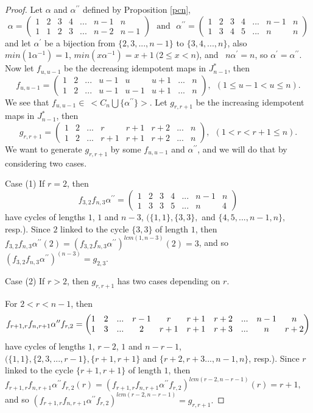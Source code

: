 \documentclass[10pt]{extarticle}
\numberwithin{equation}{section}
\numberwithin{bbb}{section}
\numberwithin{equation}{section}
\begin{document}
\begin{proof}
Let $\alpha$ and $\alpha^{\prime\prime}$ defined by Proposition \ref{pcn},
$$\alpha=
\begin{pmatrix}  
1&2&3&4&...&n-1&n\\1&1&2&3&...&n-2&n-1
\end{pmatrix} \ \ \ \text{and} \ \ \ 
\alpha^{\prime\prime}=
\begin{pmatrix}  
1&2&3&4&...&n-1&n\\1&3&4&5&...&n&n
\end{pmatrix}$$
and let $\alpha^{\prime}$ be a bijection from $\{2,3,...,n-1\}$ to $\{3,4,...,n\}$, also $min(1\alpha^{-1})=1$, $min(x\alpha^{-1})=x+1 \ (2\leq x <n$), and \ $n\alpha^{\prime}=n$, so
$\alpha^{\prime}=\alpha^{\prime\prime}.$
Now let $f_{u,u-1}$ be the decreasing idempotent maps in $J^*_{n-1}$, then
$$f_{u,u-1}=
\begin{pmatrix}  
1&2&...&u-1&u&u+1&...&n\\1&2&...&u-1&u-1&u+1&...&n
\end{pmatrix}, \ \ (1\leq u-1 <u \leq n).$$
We see that
$f_{u,u-1} \in \ <C_n \bigcup \{\alpha^{\prime\prime}\}>.$
Let $g_{r,r+1}$ be the increasing idempotent maps in $J^*_{n-1}$, then
$$g_{r,r+1}=
\begin{pmatrix}  
1&2&...&r&r+1&r+2&...&n\\1&2&...&r+1&r+1&r+2&...&n
\end{pmatrix}, \ \ (1<r<r+1 \leq n).$$
We want to generate $g_{r,r+1}$ by some $f_{u,u-1}$ and
$\alpha^{\prime\prime}$,
and we will do that by considering two cases.

\vspace{0.2cm}
Case (1) If $r=2$, then
$$f_{3,2} f_{n,3} \alpha^{\prime\prime}=
\begin{pmatrix}  
1&2&3&4&...&n-1&n\\1&3&3&5&...&n&4
\end{pmatrix}$$
have cycles of lengths $1$, $1$ and $n-3$, $( \{1,1\}, \{3,3\},$ and $\{4,5,...,n-1,n\},$ resp.). Since $2$ linked to the cycle $\{3,3\}$ of length $1$, then $f_{3,2} f_{n,3} \alpha^{\prime\prime}(2)=
(f_{3,2} f_{n,3} \alpha^{\prime\prime})^{lcm(1,n-3)}(2)=3$, and so $(f_{3,2} f_{n,3} \alpha^{\prime\prime})^{(n-3)}=g_{2,3}.$

\vspace{0.2cm}
Case (2) If $r>2$, then $g_{r,r+1}$ has two cases depending on $r$.

\vspace{0.2cm}
For $2<r<n-1$, then
$$f_{r+1,r}f_{n,r+1}\alpha^{\prime\prime}f_{r,2}=
\setcounter{MaxMatrixCols}{14}
\begin{pmatrix}
1&2&...&r-1&r&r+1&r+2&...&n-1&n\\1&3&...&2&r+1&r+1&r+3&...&n&r+2
\end{pmatrix}$$
have cycles of lengths $1$, $r-2$, $1$ and $n-r-1$, $( \{1,1\}, \{2,3,...,r-1\}, \{r+1,r+1\}$ and $\{r+2,r+3...,n-1,n\}$, resp.). Since $r$ linked
to the cycle $\{r+1,r+1\}$ of length $1$, then $f_{r+1,r}f_{n,r+1}\alpha^{\prime\prime}f_{r,2}(r)=(f_{r+1,r}f_{n,r+1}\alpha^{\prime\prime}f_{r,2})^{lcm(r-2,n-r-1)}(r)=r+1,$ and so $(f_{r+1,r}f_{n,r+1}\alpha^{\prime\prime}f_{r,2})^{lcm(r-2,n-r-1)}=g_{r,r+1}.$


\end{proof}
\end{document}
